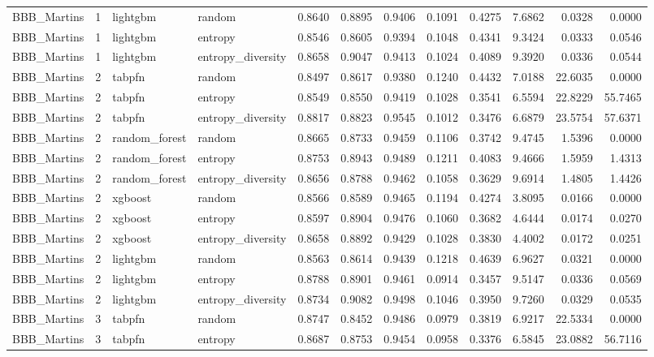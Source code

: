 \begin{tabular}{lrllrrrrrrrr}
BBB_Martins & 1 & lightgbm & random & 0.8640 & 0.8895 & 0.9406 & 0.1091 & 0.4275 & 7.6862 & 0.0328 & 0.0000 \\
BBB_Martins & 1 & lightgbm & entropy & 0.8546 & 0.8605 & 0.9394 & 0.1048 & 0.4341 & 9.3424 & 0.0333 & 0.0546 \\
BBB_Martins & 1 & lightgbm & entropy_diversity & 0.8658 & 0.9047 & 0.9413 & 0.1024 & 0.4089 & 9.3920 & 0.0336 & 0.0544 \\
BBB_Martins & 2 & tabpfn & random & 0.8497 & 0.8617 & 0.9380 & 0.1240 & 0.4432 & 7.0188 & 22.6035 & 0.0000 \\
BBB_Martins & 2 & tabpfn & entropy & 0.8549 & 0.8550 & 0.9419 & 0.1028 & 0.3541 & 6.5594 & 22.8229 & 55.7465 \\
BBB_Martins & 2 & tabpfn & entropy_diversity & 0.8817 & 0.8823 & 0.9545 & 0.1012 & 0.3476 & 6.6879 & 23.5754 & 57.6371 \\
BBB_Martins & 2 & random_forest & random & 0.8665 & 0.8733 & 0.9459 & 0.1106 & 0.3742 & 9.4745 & 1.5396 & 0.0000 \\
BBB_Martins & 2 & random_forest & entropy & 0.8753 & 0.8943 & 0.9489 & 0.1211 & 0.4083 & 9.4666 & 1.5959 & 1.4313 \\
BBB_Martins & 2 & random_forest & entropy_diversity & 0.8656 & 0.8788 & 0.9462 & 0.1058 & 0.3629 & 9.6914 & 1.4805 & 1.4426 \\
BBB_Martins & 2 & xgboost & random & 0.8566 & 0.8589 & 0.9465 & 0.1194 & 0.4274 & 3.8095 & 0.0166 & 0.0000 \\
BBB_Martins & 2 & xgboost & entropy & 0.8597 & 0.8904 & 0.9476 & 0.1060 & 0.3682 & 4.6444 & 0.0174 & 0.0270 \\
BBB_Martins & 2 & xgboost & entropy_diversity & 0.8658 & 0.8892 & 0.9429 & 0.1028 & 0.3830 & 4.4002 & 0.0172 & 0.0251 \\
BBB_Martins & 2 & lightgbm & random & 0.8563 & 0.8614 & 0.9439 & 0.1218 & 0.4639 & 6.9627 & 0.0321 & 0.0000 \\
BBB_Martins & 2 & lightgbm & entropy & 0.8788 & 0.8901 & 0.9461 & 0.0914 & 0.3457 & 9.5147 & 0.0336 & 0.0569 \\
BBB_Martins & 2 & lightgbm & entropy_diversity & 0.8734 & 0.9082 & 0.9498 & 0.1046 & 0.3950 & 9.7260 & 0.0329 & 0.0535 \\
BBB_Martins & 3 & tabpfn & random & 0.8747 & 0.8452 & 0.9486 & 0.0979 & 0.3819 & 6.9217 & 22.5334 & 0.0000 \\
BBB_Martins & 3 & tabpfn & entropy & 0.8687 & 0.8753 & 0.9454 & 0.0958 & 0.3376 & 6.5845 & 23.0882 & 56.7116 \\

\end{tabular}
